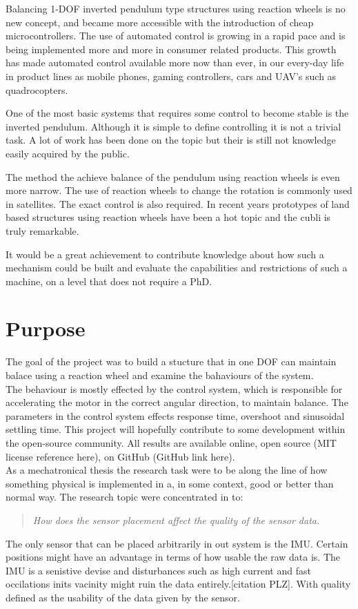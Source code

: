 \documentclass[a4paper,11pt]{kth-mag}
\newenvironment{italicquotes}
{\begin{quote}\itshape}
{\end{quote}}
\begin{document}
Balancing 1-DOF inverted pendulum type structures using reaction wheels is no
new concept, and became more accessible with the introduction of cheap microcontrollers.
The use of automated control is growing in a rapid pace and is being implemented
more and more in consumer related products.  This growth
has made automated control available more now than ever, in our every-day life in
product lines as mobile phones, gaming controllers, cars and UAV’s such as quadrocopters.

One of the most basic systems that requires some control to become stable is the inverted pendulum. 
Although it is simple to define controlling it is not a trivial task. A lot of work has been done on the topic
but their is still not knowledge easily acquired by the public. 

The method the achieve balance of the pendulum using reaction wheels is even more narrow. 
The use of reaction wheels to change the rotation is commonly used in satellites. The exact control is also required.
In recent years prototypes of land based structures using reaction wheels have been a hot topic and the cubli is
truly remarkable.

It would be a great achievement to contribute knowledge about how such a mechanism could be built and evaluate
the capabilities and restrictions of such a machine, on a level that does not require a PhD.


\section{Purpose}
The goal of the project was to build a stucture that in one DOF can maintain balace using a reaction wheel and examine the bahaviours of the system.\\
The behaviour is mostly effected by the control system, which is responsible for accelerating the motor in the  correct angular direction, to maintain balance. The parameters in the control system effects response time, overshoot and sinusoidal settling time.
This project will hopefully contribute to some development within the open-source community.
All results are available online, open source (MIT license reference here), on GitHub (GitHub link here).\\ 
As a mechatronical thesis the research task were to be along the line of how something physical is implemented 
in a, in some context, good or better than normal way. The research topic were concentrated in to: 
\begin{italicquotes}
How does the sensor placement affect the quality of the sensor data.
\end{italicquotes}
The only sensor that can be placed arbitrarily in out system is the IMU. Certain positions might have an advantage in terms of how usable the raw data is. The IMU is a senistive devise and disturbances such as high current and fast occilations inits vacinity might ruin the data entirely.[citation PLZ]. With quality defined as the usability of the data given by the sensor.
\end{document}

